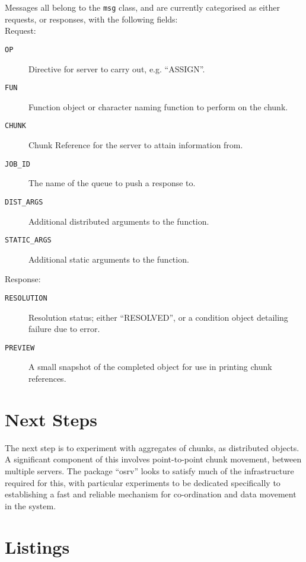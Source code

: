 \documentclass[a4paper,10pt]{article}
\begin{document}
Messages all belong to the \texttt{msg} class, and are currently categorised as
either requests, or responses, with the following fields:\\

Request:
\begin{description}
	\item[\texttt{OP}] Directive for server to carry out, e.g. ``ASSIGN''.
	\item[\texttt{FUN}] Function object or character naming function to
		perform on the chunk.
	\item[\texttt{CHUNK}] Chunk Reference for the server to attain
		information from.
	\item[\texttt{JOB\_ID}] The name of the queue to push a response to.
	\item[\texttt{DIST\_ARGS}] Additional distributed arguments to the
		function.
	\item[\texttt{STATIC\_ARGS}] Additional static arguments to the
		function.
\end{description}

Response:
\begin{description}
	\item[\texttt{RESOLUTION}] Resolution status; either ``RESOLVED'', or a
		condition object detailing failure due to error.
	\item[\texttt{PREVIEW}]  A small snapshot of the completed object for
		use in printing chunk references.
\end{description}

\section{Next Steps}

The next step is to experiment with aggregates of chunks, as distributed objects.
A significant component of this involves point-to-point chunk movement, between multiple servers.
The package ``osrv'' looks to satisfy much of the infrastructure required for
this, with particular experiments to be dedicated specifically to establishing
a fast and reliable mechanism for co-ordination and data movement in the system.

\section{Listings}\label{sec:listings}
\end{document}
